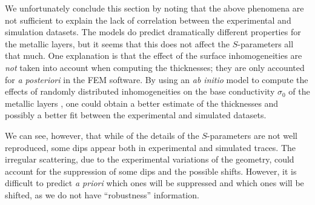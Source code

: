 We unfortunately conclude this section by noting that the above phenomena
are not sufficient to explain the lack of correlation between the experimental
and simulation datasets. The models do predict dramatically different properties
for the metallic layers, but it seems that this does not affect the $S$-parameters
all that much. One explanation is that the effect of the surface inhomogeneities
are \textit{not} taken into account when computing the thicknesses; they are only
accounted for \textit{a posteriori} in the FEM software. By using an
\textit{ab initio} model to compute the effects of randomly distributed inhomogeneities
on the base conductivity $\sigma_0$ of the metallic layers \cite{CUR2012}, one could obtain a better
estimate of the thicknesses and possibly a better fit between the experimental and simulated datasets.

We can see, however, that while of the details of the $S$-parameters are not well reproduced, some
dips appear both in experimental and simulated traces. The irregular scattering, due to the experimental
variations of the geometry, could account for the suppression of some dips and the possible shifts. 
However, it is difficult to predict \textit{a priori} which ones will be suppressed and which ones will
be shifted, as we do not have ``robustness'' information. 
